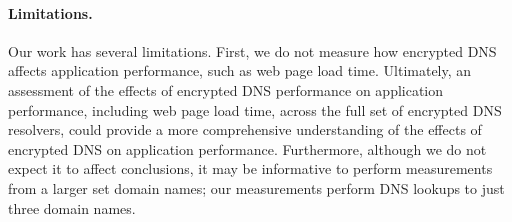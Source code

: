 \paragraph{Limitations.} Our work has several limitations.
First, we do not measure how encrypted DNS affects application
performance, such as web page load time. Ultimately, an assessment of the
effects of encrypted DNS performance on application performance, including web
page load time, across the full set of encrypted DNS resolvers, could provide
a more comprehensive understanding of the effects of encrypted DNS on
application performance. Furthermore, although we do not expect it to affect conclusions, it may
be informative to perform measurements from a larger set domain names; our
measurements perform DNS lookups to just three domain names.
